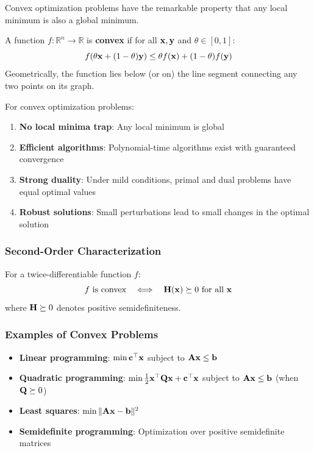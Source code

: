 Convex optimization problems have the remarkable property that any local minimum is also a global minimum.

\begin{definitionbox}[title=Definition: Convex Function]
A function $f: \mathbb{R}^n \to \mathbb{R}$ is \textbf{convex} if for all $\mathbf{x}, \mathbf{y}$ and $\theta \in [0,1]$:
\begin{equation}
f(\theta\mathbf{x} + (1-\theta)\mathbf{y}) \leq \theta f(\mathbf{x}) + (1-\theta)f(\mathbf{y})
\end{equation}
Geometrically, the function lies below (or on) the line segment connecting any two points on its graph.
\end{definitionbox}

\begin{keyconceptbox}[title=Why Convexity Matters]
For convex optimization problems:
\begin{enumerate}
    \item \textbf{No local minima trap}: Any local minimum is global
    \item \textbf{Efficient algorithms}: Polynomial-time algorithms exist with guaranteed convergence
    \item \textbf{Strong duality}: Under mild conditions, primal and dual problems have equal optimal values
    \item \textbf{Robust solutions}: Small perturbations lead to small changes in the optimal solution
\end{enumerate}
\end{keyconceptbox}

\subsubsection{Second-Order Characterization}
For a twice-differentiable function $f$:
\begin{equation}
f \text{ is convex} \quad \Longleftrightarrow \quad \mathbf{H}(\mathbf{x}) \succeq 0 \text{ for all } \mathbf{x}
\end{equation}
where $\mathbf{H} \succeq 0$ denotes positive semidefiniteness.

\subsubsection{Examples of Convex Problems}
\begin{itemize}
    \item \textbf{Linear programming}: $\min \mathbf{c}^\top\mathbf{x}$ subject to $\mathbf{A}\mathbf{x} \leq \mathbf{b}$
    \item \textbf{Quadratic programming}: $\min \frac{1}{2}\mathbf{x}^\top\mathbf{Q}\mathbf{x} + \mathbf{c}^\top\mathbf{x}$ subject to $\mathbf{A}\mathbf{x} \leq \mathbf{b}$ (when $\mathbf{Q} \succeq 0$)
    \item \textbf{Least squares}: $\min \|\mathbf{A}\mathbf{x} - \mathbf{b}\|^2$
    \item \textbf{Semidefinite programming}: Optimization over positive semidefinite matrices
\end{itemize}


